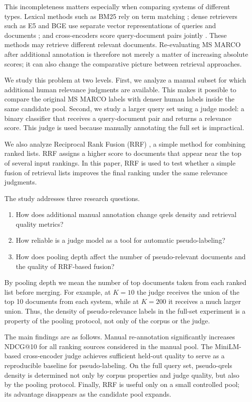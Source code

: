 \documentclass[runningheads,a4paper]{llncs}
\begin{document}
This incompleteness matters especially when comparing systems of different types. Lexical methods such as BM25 rely on term matching \cite{robertson2009bm25}; dense retrievers such as E5 and BGE use separate vector representations of queries and documents \cite{wang2022e5,xiao2023cpack}; and cross-encoders score query-document pairs jointly \cite{nogueira2019bert}. These methods may retrieve different relevant documents. Re-evaluating MS MARCO after additional annotation is therefore not merely a matter of increasing absolute scores; it can also change the comparative picture between retrieval approaches.

We study this problem at two levels. First, we analyze a manual subset for which additional human relevance judgments are available. This makes it possible to compare the original MS MARCO labels with denser human labels inside the same candidate pool. Second, we study a larger query set using a judge model: a binary classifier that receives a query-document pair and returns a relevance score. This judge is used because manually annotating the full set is impractical.

We also analyze Reciprocal Rank Fusion (RRF) \cite{cormack2009rrf}, a simple method for combining ranked lists. RRF assigns a higher score to documents that appear near the top of several input rankings. In this paper, RRF is used to test whether a simple fusion of retrieval lists improves the final ranking under the same relevance judgments.

The study addresses three research questions.
\begin{enumerate}
\item How does additional manual annotation change qrels density and retrieval quality metrics?
\item How reliable is a judge model as a tool for automatic pseudo-labeling?
\item How does pooling depth affect the number of pseudo-relevant documents and the quality of RRF-based fusion?
\end{enumerate}

By pooling depth we mean the number of top documents taken from each ranked list before merging. For example, at $K=10$ the judge receives the union of the top 10 documents from each system, while at $K=200$ it receives a much larger union. Thus, the density of pseudo-relevance labels in the full-set experiment is a property of the pooling protocol, not only of the corpus or the judge.

The main findings are as follows. Manual re-annotation significantly increases NDCG@10 for all ranking sources considered in the manual pool. The MiniLM-based cross-encoder judge \cite{wang2020minilm,reimers2019sentencebert} achieves sufficient held-out quality to serve as a reproducible baseline for pseudo-labeling. On the full query set, pseudo-qrels density is determined not only by corpus properties and judge quality, but also by the pooling protocol. Finally, RRF is useful only on a small controlled pool; its advantage disappears as the candidate pool expands.
\end{document}
